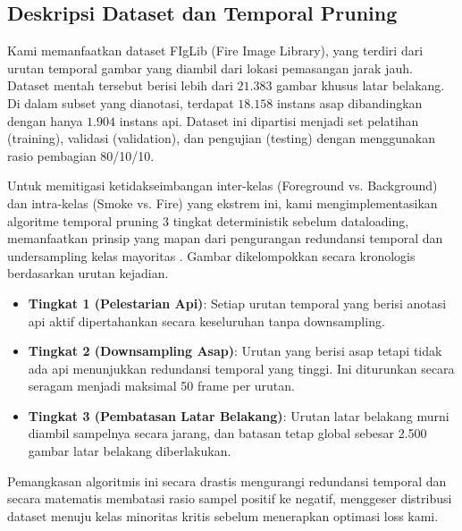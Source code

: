 \documentclass[conference]{IEEEtran}
\begin{document}
\subsection{Deskripsi Dataset dan Temporal Pruning}
Kami memanfaatkan dataset FIgLib (Fire Image Library), yang terdiri dari urutan temporal gambar yang diambil dari lokasi pemasangan jarak jauh. Dataset mentah tersebut berisi lebih dari $21.383$ gambar khusus latar belakang. Di dalam subset yang dianotasi, terdapat $18.158$ instans asap dibandingkan dengan hanya $1.904$ instans api. Dataset ini dipartisi menjadi set pelatihan (training), validasi (validation), dan pengujian (testing) dengan menggunakan rasio pembagian 80/10/10. 

Untuk memitigasi ketidakseimbangan inter-kelas (Foreground vs. Background) dan intra-kelas (Smoke vs. Fire) yang ekstrem ini, kami mengimplementasikan algoritme temporal pruning 3 tingkat deterministik sebelum dataloading, memanfaatkan prinsip yang mapan dari pengurangan redundansi temporal \cite{wu2019adaframe} dan undersampling kelas mayoritas \cite{drummond2003c4, he2009imbalanced}. Gambar dikelompokkan secara kronologis berdasarkan urutan kejadian. 
\begin{itemize}
    \item \textbf{Tingkat 1 (Pelestarian Api)}: Setiap urutan temporal yang berisi anotasi api aktif dipertahankan secara keseluruhan tanpa downsampling.
    \item \textbf{Tingkat 2 (Downsampling Asap)}: Urutan yang berisi asap tetapi tidak ada api menunjukkan redundansi temporal yang tinggi. Ini diturunkan secara seragam menjadi maksimal 50 frame per urutan.
    \item \textbf{Tingkat 3 (Pembatasan Latar Belakang)}: Urutan latar belakang murni diambil sampelnya secara jarang, dan batasan tetap global sebesar 2.500 gambar latar belakang diberlakukan.
\end{itemize}
Pemangkasan algoritmis ini secara drastis mengurangi redundansi temporal dan secara matematis membatasi rasio sampel positif ke negatif, menggeser distribusi dataset menuju kelas minoritas kritis sebelum menerapkan optimasi loss kami.
\end{document}
